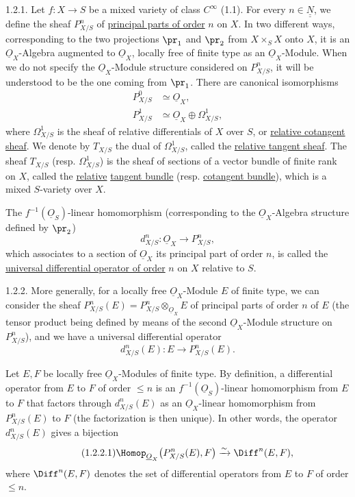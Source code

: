 1.2.1. Let $f:X\to S$ be a mixed variety of class $C^\infty$ (1.1). For every $n\in\underline{\underline{N}}$, we define the sheaf $P^n_{X/S}$ of \uline{principal parts of order} $n$ on $X$. In two different ways, corresponding to the two projections $\pr_1$ and $\pr_2$ from $X\times_S X$ onto $X$, it is an $\underline{O}_X$-Algebra augmented to $\underline{O}_X$, locally free of finite type as an $\underline{O}_X$-Module. When we do not specify the $\underline{O}_X$-Module structure considered on $P^n_{X/S}$, it will be understood to be the one coming from $\pr_1$. There are canonical isomorphisms
%
\[
  \begin{aligned}
  P^0_{X/S}&\simeq\underline{O}_X,\\
  P^1_{X/S}&\simeq\underline{O}_X\oplus\Omega^1_{X/S},
  \end{aligned}
\]
where $\Omega^1_{X/S}$ is the sheaf of relative differentials of $X$ over $S$, or \uline{relative cotangent sheaf}. We denote by $T_{X/S}$ the dual of $\Omega^1_{X/S}$, called the \uline{relative tangent sheaf}. The sheaf $T_{X/S}$ (resp. $\Omega^1_{X/S}$) is the sheaf of sections of a vector bundle of finite rank on $X$, called the \uline{relative} \uline{tangent bundle} (resp. \uline{cotangent bundle}), which is a mixed $S$-variety over $X$.

The $f^{-1}(\underline{O}_S)$-linear homomorphism (corresponding to the $\underline{O}_X$-Algebra structure defined by $\pr_2$)
\[
  d^n_{X/S}:\underline{O}_X\longrightarrow P^n_{X/S},
\]
which associates to a section of $\underline{O}_X$ its principal part of order $n$, is called the \uline{universal differential operator of order} $n$ on $X$ relative to $S$.

1.2.2. More generally, for a locally free $\underline{O}_X$-Module $E$ of finite type, we can consider the sheaf $P^n_{X/S}(E)=P^n_{X/S}\otimes_{\underline{O}_X}E$ of principal parts of order $n$ of $E$ (the tensor product being defined by means of the second $\underline{O}_X$-Module structure on $P^n_{X/S}$), and we have a universal differential operator
\[
  d^n_{X/S}(E):E\longrightarrow P^n_{X/S}(E).
\]

Let $E,F$ be locally free $\underline{O}_X$-Modules of finite type. By definition, a differential operator from $E$ to $F$ of order $\le n$ is an $f^{-1}(\underline{O}_S)$-linear homomorphism from $E$ to $F$ that factors through $d^n_{X/S}(E)$ as an $\underline{O}_X$-linear homomorphism from $P^n_{X/S}(E)$ to $F$ (the factorization is then unique). In other words, the operator $d^n_{X/S}(E)$ gives a bijection
\begin{equation}\tag{1.2.2.1}
  \Homop_{\underline{O}_X}\bigl(P^n_{X/S}(E),F\bigr)
  \xrightarrow{\sim}
  \Diff^n(E,F),
\end{equation}
where $\Diff^n(E,F)$ denotes the set of differential operators from $E$
%
to $F$ of order $\le n$.

